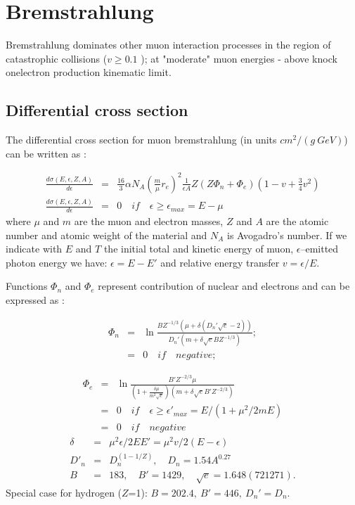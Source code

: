 \chapter[Bremstrahlung]{Bremstrahlung}

Bremstrahlung dominates other muon interaction processes in the region of
catastrophic collisions ($v \geq 0.1$ ); at "moderate" muon 
energies - above knock onelectron production kinematic limit.

\section{Differential cross section }

The differential cross section for muon bremstrahlung (in units $cm^{2}/(g~GeV)$)
can be written as :


\begin{eqnarray}
    \frac{d \sigma (E, \epsilon, Z, A )} {d \epsilon} &=&
  \frac{16}{3} \alpha N_{A} (\frac{m}{\mu} r_{e} )^2 \frac{1}{ \epsilon A} Z
  (Z \Phi_{n}+ \Phi_{e})(1-v+\frac{3}{4}v^{2})   \\  
    \frac{d \sigma (E, \epsilon, Z, A )} {d \epsilon} &=& 0 \quad
    if \quad \epsilon \geq \epsilon_{max} = E- \mu  \nonumber
\end{eqnarray}
%
where $\mu$ and $m$ are the muon and  electron masses,
$Z$ and $A$ are the atomic number and atomic weight of the material
and $N_{A}$ is Avogadro's number.
 If we indicate with $E$ and $T$ the initial total and kinetic energy of muon,
$\epsilon$--emitted photon energy we have: $\epsilon = E - E'$ and
relative energy transfer $v = \epsilon /E$.

Functions $\Phi_{n}$ and $\Phi_{e}$ represent contribution 
of nuclear and electrons and can be expressed as :

\begin{eqnarray*}
 \Phi_{n} &=& \ln \frac {BZ^{-1/3}(\mu + \delta (D_{n}' \sqrt{e} -2))}
    {D_{n}'(m+ \delta \sqrt{e}BZ^{-1/3})} ; \\
   &=&  0 \quad if \quad negative;
\end{eqnarray*}

\begin{eqnarray*}
  \Phi_{e} &=& \ln \frac {B'Z^{-2/3} \mu }
   {(1+ \frac{\delta \mu}{m^{2} \sqrt{e}})(m+ \delta \sqrt{e} B'Z^{-2/3}) }  \\
   &=&  0 \quad if \quad \epsilon \geq \epsilon'_{max} = E/(1+ \mu^{2}/2mE) \\
   &=&  0 \quad if \quad negative    
\end{eqnarray*}
%
\begin{eqnarray*}
\delta &=& \mu^{2} \epsilon /2EE' = \mu^{2} v/2(E- \epsilon) \\
D'_{n} &=& D_{n}^{(1-1/Z)}, \quad D_{n}= 1.54A^{0.27}  \\
B &=& 183, \quad B'=1429, \quad \sqrt{e}=1.648(721271).
\end{eqnarray*}
%
Special case for hydrogen ($Z$=1): $B = 202.4,\: B' = 446, \: D_{n}' = D_{n}$.


